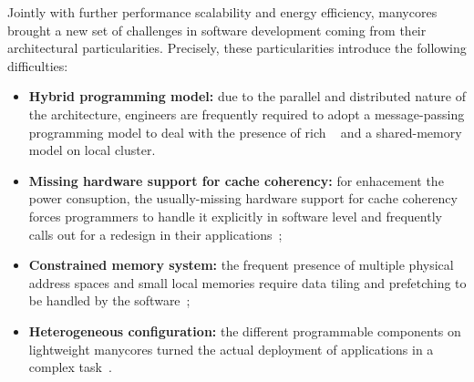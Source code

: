     Jointly with further performance scalability and energy efficiency, manycores brought a new set of challenges in software development coming from their architectural particularities.
    Precisely, these particularities introduce the following difficulties:
    \begin{itemize}
        \item \textbf{Hybrid programming model:} due to the parallel and distributed nature of the architecture, engineers are frequently required to adopt a message-passing programming model to deal with the presence of rich \nocs~\cite{kelly2013} and a shared-memory model on local cluster.
        \item \textbf{Missing hardware support for cache coherency:} for enhacement the power consuption, the usually-missing hardware support for cache coherency forces programmers to handle it explicitly in software level and frequently calls out for a redesign in their applications~\cite{francesquini2015};
        \item \textbf{Constrained memory system:} the frequent presence of multiple physical address spaces and small local memories require data tiling and prefetching to be handled by the software~\cite{Castro2016};
        \item \textbf{Heterogeneous configuration:} the different programmable components on lightweight manycores turned the actual deployment of applications in a complex task~\cite{barbalace2015}.
    \end{itemize}



